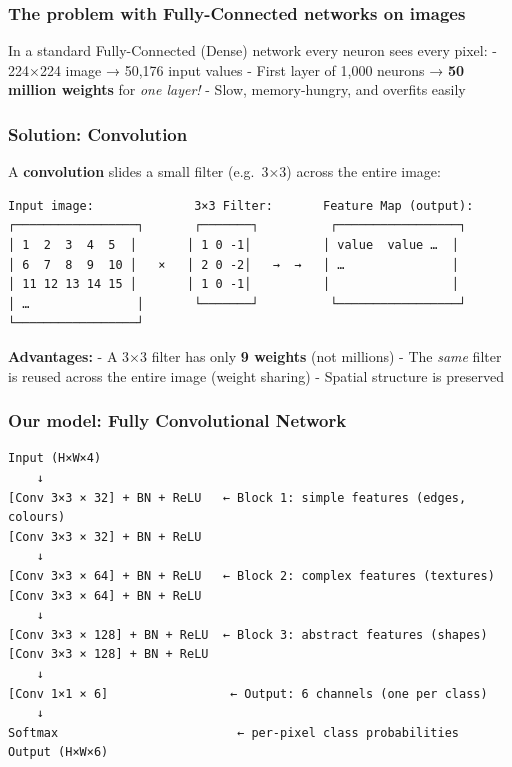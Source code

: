 \documentclass[11pt]{article}
\begin{document}
\subsubsection{The problem with Fully-Connected networks on
images}\label{the-problem-with-fully-connected-networks-on-images}

In a standard Fully-Connected (Dense) network every neuron sees every
pixel: - 224×224 image → 50,176 input values - First layer of 1,000
neurons → \textbf{50 million weights} for \emph{one layer!} - Slow,
memory-hungry, and overfits easily

\subsubsection{Solution: Convolution}\label{solution-convolution}

A \textbf{convolution} slides a small filter (e.g.~3×3) across the
entire image:

\begin{verbatim}
Input image:              3×3 Filter:       Feature Map (output):
┌─────────────────┐       ┌───────┐          ┌─────────────────┐
│ 1  2  3  4  5  │       │ 1 0 -1│          │ value  value …  │
│ 6  7  8  9  10 │   ×   │ 2 0 -2│   →  →   │ …               │
│ 11 12 13 14 15 │       │ 1 0 -1│          │                 │
│ …               │       └───────┘          └─────────────────┘
└─────────────────┘
\end{verbatim}

\textbf{Advantages:} - A 3×3 filter has only \textbf{9 weights} (not
millions) - The \emph{same} filter is reused across the entire image
(weight sharing) - Spatial structure is preserved

\subsubsection{Our model: Fully Convolutional
Network}\label{our-model-fully-convolutional-network}

\begin{verbatim}
Input (H×W×4)
    ↓
[Conv 3×3 × 32] + BN + ReLU   ← Block 1: simple features (edges, colours)
[Conv 3×3 × 32] + BN + ReLU
    ↓
[Conv 3×3 × 64] + BN + ReLU   ← Block 2: complex features (textures)
[Conv 3×3 × 64] + BN + ReLU
    ↓
[Conv 3×3 × 128] + BN + ReLU  ← Block 3: abstract features (shapes)
[Conv 3×3 × 128] + BN + ReLU
    ↓
[Conv 1×1 × 6]                 ← Output: 6 channels (one per class)
    ↓
Softmax                         ← per-pixel class probabilities
Output (H×W×6)
\end{verbatim}
\end{document}
